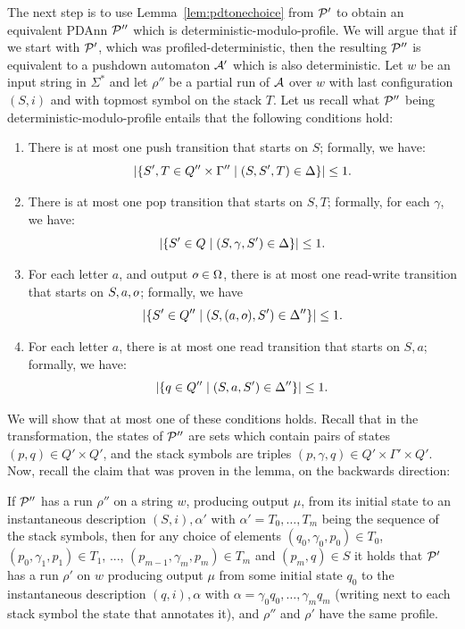 The next step is to use Lemma~\ref{lem:pdtonechoice} from $\mathcal{P}'$ to obtain an equivalent PDAnn $\mathcal{P}''$ which is deterministic-modulo-profile. We will argue that if we start with $\mathcal{P}'$, which was profiled-deterministic, then the resulting $\mathcal{P}''$ is equivalent to a pushdown automaton $\mathcal{A}'$ which is also deterministic. Let $w$ be an input string in $\Sigma^*$ and let $\rho''$ be a partial run of $\mathcal{A}$ over $w$ with last configuration $(S, i)$ and with topmost symbol on the stack $T$. Let us recall what $\mathcal{P}''$ being deterministic-modulo-profile entails that the following conditions hold:
  \begin{enumerate}
	\item There is at most one push transition that
	starts on $S$; formally, we have:
        \[\left|\{S', T \in Q'' \times \Gamma'' \mid
                (S, S', T) \in \Delta\}\right| \leq 1.\]
	\item There is at most
	one pop transition that starts on $S,T$; formally, for each $\gamma$, we
        have:
        \[\left|\{S'
                \in Q \mid (S, \gamma, S') \in \Delta\}\right| \leq 1.\]
	\item For each letter $a$, and output $\oout \in \Omega$, there is at most one read-write transition that starts on
          $S,a,\oout$; formally, we have \[\card{\{S' \in Q'' \mid (S,(a,\oout),S') \in \Delta''\}}
        \leq 1.\]
	\item For each letter $a$, there is at most one read transition that starts on
          $S,a$; formally, we have: \[\left|\{q \in Q'' \mid (S,a,S') \in \Delta''\}\right|
        \leq 1.\]
\end{enumerate}
We will show that at most one of these conditions holds. Recall that in the transformation, the states of $\mathcal{P}''$ are sets which contain pairs of states $(p,q)\in Q'\times Q'$, and the stack symbols are triples $(p, \gamma, q)\in Q'\times\Gamma' \times Q'$. Now, recall the claim that was proven in the lemma, on the backwards direction:

If $\mathcal{P}''$ has a run $\rho''$ on a string $w$, producing output $\mu$, from its initial state to an instantaneous
description $(S, i), \alpha'$ with $\alpha' =
T_0, \ldots, T_m$ being the sequence of the stack
symbols, then for any choice of elements $(q_0, \gamma_0, p_0) \in T_0$,
$(p_0, \gamma_1, p_1) \in T_1$, ..., $(p_{m-1}, \gamma_m, p_m) \in T_m$
and $(p_m, q) \in S$ it holds that $\mathcal{P}'$ has a run $\rho'$ on $w$ producing output $\mu$
from some initial state $q_0$ to the instantaneous description $(q, i), \alpha$ with
$\alpha = \gamma_0 q_0, \ldots, \gamma_m q_m$ (writing next to each
stack symbol the state that annotates it), and $\rho''$ and $\rho'$ have
the same profile. 

